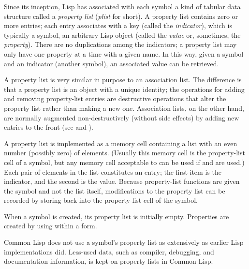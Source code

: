 Since its inception, Lisp has associated with each symbol
a kind of tabular data structure
called a \emph{property list} (\emph{plist} for short).  A property list contains
zero or more entries; each entry associates with a key
(called the \emph{indicator}), which is typically
a symbol, an arbitrary Lisp object (called the \emph{value} or,
sometimes, the \emph{property}).
There are no duplications among the indicators; a property list may only
have one property at a time with a given name.  In this way, given
a symbol and an indicator (another symbol), an associated value can be
retrieved.

A property
list is very similar in purpose to an association list. The difference
is that a property list is an object with a unique identity; the
operations for adding and removing property-list entries are destructive
operations that alter the property list rather than making a new one.
Association lists, on the other hand, are normally augmented
non-destructively (without side effects) by adding new entries to the
front (see  and ).

A property list is implemented as a memory cell
containing a list with an even number (possibly zero) of elements.
(Usually this memory cell is the property-list cell of a symbol,
but any memory cell acceptable to  can be used
if  and  are used.)
Each pair of elements in the list constitutes an entry;
the first item is the indicator, and the second is the
value.  Because property-list functions are given the symbol
and not the list itself, modifications to the property list
can be recorded by storing back into the property-list cell of the symbol.

When a symbol is created, its property list is initially empty.
Properties are created by using  within a  form.

Common Lisp does not use a symbol's property list as extensively as earlier
Lisp implementations did.  Less-used data, such as compiler,
debugging, and documentation information, is kept on property lists
in Common Lisp.

